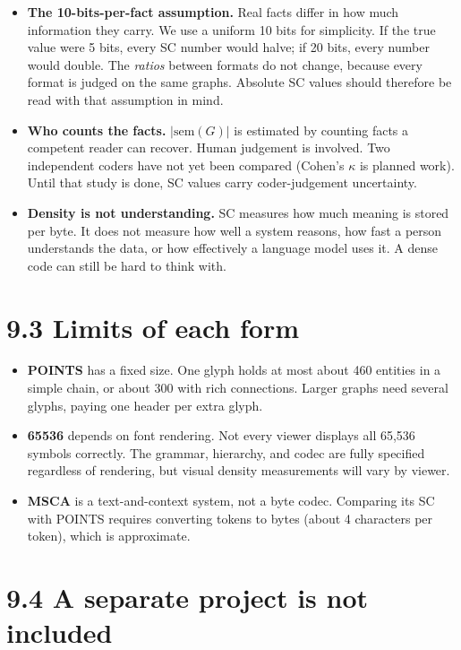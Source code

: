 \begin{itemize}
\item \textbf{The 10-bits-per-fact assumption.} Real facts differ in how much information they carry. We use a uniform 10 bits for simplicity. If the true value were 5 bits, every SC number would halve; if 20 bits, every number would double. The \textit{ratios} between formats do not change, because every format is judged on the same graphs. Absolute SC values should therefore be read with that assumption in mind.
\item \textbf{Who counts the facts.} $|\text{sem}(G)|$ is estimated by counting facts a competent reader can recover. Human judgement is involved. Two independent coders have not yet been compared (Cohen's $\kappa$ is planned work). Until that study is done, SC values carry coder-judgement uncertainty.
\item \textbf{Density is not understanding.} SC measures how much meaning is stored per byte. It does not measure how well a system reasons, how fast a person understands the data, or how effectively a language model uses it. A dense code can still be hard to think with.
\end{itemize}

\section*{9.3 Limits of each form}

\begin{itemize}
\item \textbf{POINTS} has a fixed size. One glyph holds at most about 460 entities in a simple chain, or about 300 with rich connections. Larger graphs need several glyphs, paying one header per extra glyph.
\item \textbf{65536} depends on font rendering. Not every viewer displays all 65,536 symbols correctly. The grammar, hierarchy, and codec are fully specified regardless of rendering, but visual density measurements will vary by viewer.
\item \textbf{MSCA} is a text-and-context system, not a byte codec. Comparing its SC with POINTS requires converting tokens to bytes (about 4 characters per token), which is approximate.
\end{itemize}

\section*{9.4 A separate project is not included}

